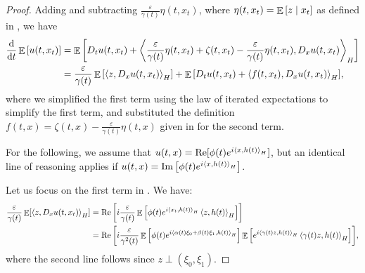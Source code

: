 \begin{proof}
  Adding and subtracting \(\frac{\varepsilon}{\gamma(t)} \eta(t, x_{t})\), where \(\eta(t, x_{t}) = \mathop{\mathbb{E}}\qty[ z \mid x_{t}]\) as defined in , we have
  \begin{align}
    \dv{t} \mathop{\mathbb{E}}\qty[u(t, x_{t})] &= \mathop{\mathbb{E}}\qty[D_{t} u(t, x_{t}) + \ev{ \frac{\varepsilon}{\gamma(t)}\eta(t, x_{t}) + \zeta(t, x_{t}) - \frac{\varepsilon}{\gamma(t)} \eta(t, x_{t}), D_{x} u(t, x_{t})}_{H}] \notag \\
    &= \frac{\varepsilon}{\gamma(t)}\mathop{\mathbb{E}}\qty[\ev{z, D_{x}u(t, x_{t})}_{H}] + \mathop{\mathbb{E}}\qty[ D_{t}u(t, x_{t}) + \ev{f(t, x_{t}), D_{x} u(t, x_{t})}_{H}], \label{eqn:simpl}
  \end{align}
  where we simplified the first term using the law of iterated expectations to simplify the first term, and substituted the definition \(f(t, x) = \zeta(t, x) - \frac{\varepsilon}{\gamma(t)} \eta(t, x)\) given in  for the second term.

  For the following, we assume that \(u(t, x) = \operatorname{Re}[\phi(t) e^{i \ev{x, h(t)}_{H}}]\), but an identical line of reasoning applies if \(u(t, x) = \operatorname{Im}\qty[\phi(t) e^{i \ev{x, h(t)}_{H}}]\).

  Let us focus on the first term in . We have:
  \begin{align}
    \frac{\varepsilon}{\gamma(t)} \mathop{\mathbb{E}}[\ev{z, D_{x} u(t, x_{t})}_{H}] &= \operatorname{Re}\qty[i \frac{\varepsilon}{\gamma(t)} \mathop{\mathbb{E}}\qty[\phi(t) e^{i \ev{x_{t}, h(t)}_{H}} \ev{z, h(t)}_{H}]] \notag \\
    &= \operatorname{Re}\qty[i \frac{\varepsilon}{\gamma^{2}(t)} \mathop{\mathbb{E}}\qty[\phi(t) e^{i \ev{\alpha(t) \xi_{0} + \beta(t) \xi_{1}, h(t)}_{H}}] \mathop{\mathbb{E}}\qty[e^{i \ev{\gamma(t) z, h(t)}_{H}} \ev{\gamma(t) z, h(t)}_{H}]], \label{eqn:nearlythere}
  \end{align}
  where the second line follows since \(z \perp (\xi_{0}, \xi_{1})\).


\end{proof}
